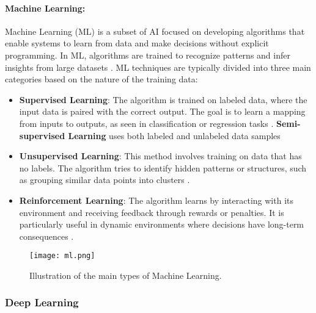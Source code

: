 \paragraph{Machine Learning:} Machine Learning (ML) is a subset of AI focused on developing algorithms that enable systems to learn from data and make decisions without explicit programming. In ML, algorithms are trained to recognize patterns and infer insights from large datasets \cite{bishop2006pattern}.
ML techniques are typically divided into three main categories based on the nature of the training data:
\begin{itemize} 
    \item \textbf{Supervised Learning}: The algorithm is trained on labeled data, where the input data is paired with the correct output. The goal is to learn a mapping from inputs to outputs, as seen in classification or regression tasks \cite{murphy2012machine}. \textbf{Semi-supervised Learning} uses both labeled and unlabeled data samples 
    \item \textbf{Unsupervised Learning}: This method involves training on data that has no labels. The algorithm tries to identify hidden patterns or structures, such as grouping similar data points into clusters \cite{james2013introduction}. 
    \item \textbf{Reinforcement Learning}: The algorithm learns by interacting with its environment and receiving feedback through rewards or penalties. It is particularly useful in dynamic environments where decisions have long-term consequences \cite{sutton2018reinforcement}. 
\end{itemize}
\begin{figure}[H]
    \centering
    \texttt{[image: ml.png]}
    \caption{Illustration of the main types of Machine Learning.}
    \label{fig:ml}
\end{figure}

\subsubsection{Deep Learning}
